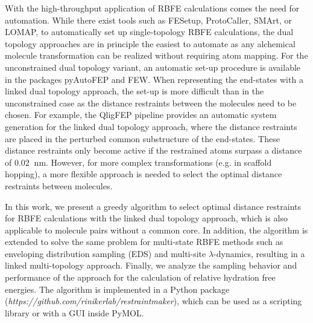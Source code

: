 With the high-throughput application of RBFE calculations comes the need for automation.\cite{Christ2014} While there exist tools such as FESetup,\cite{Loeffler2015} ProtoCaller,\cite{Suruzhon2020} SMArt,\cite{Petrov2021} or LOMAP,\cite{Liu2013} to automatically set up single-topology RBFE calculations, the dual topology approaches are in principle the easiest to automate as any alchemical molecule transformation can be realized without requiring atom mapping.\cite{Rocklin2013}
For the unconstrained dual topology variant, an automatic set-up procedure is available in the packages pyAutoFEP\cite{Carvalho2021} and FEW\cite{Homeyer2013}.
When representing the end-states with a linked dual topology approach, the set-up is more difficult than in the unconstrained case as the distance restraints between the molecules need to be chosen.
For example, the QligFEP pipeline\cite{Jespers2019} provides an automatic system generation for the linked dual topology approach, where the distance restraints are placed in the perturbed common substructure of the end-states. These distance restraints only become active if the restrained atoms surpass a distance of $0.02~$ nm.
However, for more complex transformations (e.g. in scaffold hopping), a more flexible approach is needed to select the optimal distance restraints between molecules.

In this work, we present a greedy algorithm to select optimal distance restraints for RBFE calculations with the linked dual topology approach, which is also applicable to molecule pairs without a common core. In addition, the algorithm is extended to solve the same problem for multi-state RBFE methods such as enveloping distribution sampling (EDS)\cite{Christ2007,Christ2008} and multi-site $\lambda$-dynamics,\cite{Knight2011} resulting in a linked multi-topology approach. Finally, we analyze the sampling behavior and performance of the approach for the calculation of relative hydration free energies. The algorithm is implemented in a Python package\\ (\textit{https://github.com/rinikerlab/restraintmaker}), which can be used as a scripting library or with a GUI inside PyMOL. \cite{Delano2020}
